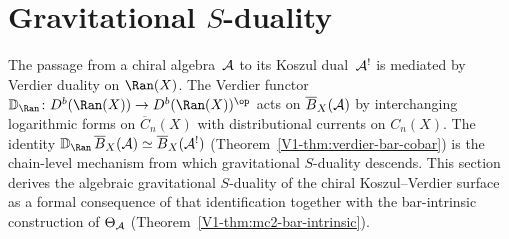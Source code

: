 
\section{Gravitational \texorpdfstring{$S$}{S}-duality}

\providecommand{\Bbbk}{\mathbb{k}}
\providecommand{\HS}{\operatorname{HS}}
\providecommand{\wt}{\operatorname{wt}}
\providecommand{\CE}{\operatorname{CE}}
\providecommand{\End}{\operatorname{End}}
\providecommand{\Hom}{\operatorname{Hom}}
\providecommand{\Sym}{\operatorname{Sym}}
\providecommand{\id}{\mathrm{id}}
\providecommand{\Tr}{\operatorname{Tr}}
\providecommand{\Det}{\operatorname{Det}}
\providecommand{\Aut}{\operatorname{Aut}}
\providecommand{\Spec}{\operatorname{Spec}}
\providecommand{\Res}{\operatorname{Res}}
\providecommand{\rank}{\operatorname{rank}}
\providecommand{\ad}{\operatorname{ad}}
\providecommand{\Fred}{\operatorname{Fred}}
\providecommand{\VD}{\mathbb{D}}
\providecommand{\DS}{\mathrm{DS}}
\providecommand{\fib}{\operatorname{fib}}
\providecommand{\CoDer}{\operatorname{CoDer}}
\providecommand{\MC}{\mathrm{MC}}
\providecommand{\Defcyc}{\mathrm{Def}_{\mathrm{cyc}}}
\providecommand{\Sh}{\mathrm{Sh}}
\providecommand{\gr}{\operatorname{gr}}
\providecommand{\Map}{\operatorname{Map}}
\providecommand{\RGamma}{R\Gamma}
\providecommand{\Perf}{\operatorname{Perf}}
\providecommand{\RHom}{\operatorname{RHom}}
\providecommand{\HH}{\operatorname{HH}}
\providecommand{\Loc}{\operatorname{Loc}}

The passage from a chiral algebra~$\mathcal{A}$ to its Koszul dual~$\mathcal{A}^!$
is mediated by Verdier duality on $\Ran(X)$. The Verdier functor
$\VD_{\Ran}\colon D^b(\Ran(X)) \to D^b(\Ran(X))^{\op}$
acts on $\overline{B}_X(\mathcal{A})$ by interchanging logarithmic forms on
$\overline{C}_n(X)$ with distributional currents on $C_n(X)$.
The identity
$\VD_{\Ran}\,\barB_X(\cA) \simeq \barB_X(\cA^!)$
(Theorem~\ref*{V1-thm:verdier-bar-cobar}) is the chain-level
mechanism from which gravitational $S$-duality descends.
This section derives the algebraic gravitational $S$-duality of the
chiral Koszul--Verdier surface as a formal consequence of that
identification together with the bar-intrinsic construction of
$\Theta_{\mathcal{A}}$ (Theorem~\ref*{V1-thm:mc2-bar-intrinsic}).

